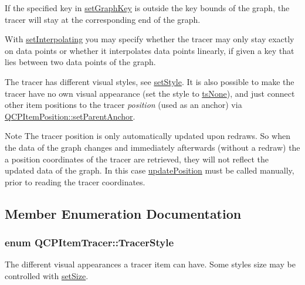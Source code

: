 If the specified key in \hyperlink{classQCPItemTracer_a6840143b42f3b685cedf7c6d83a704c8}{set\+Graph\+Key} is outside the key bounds of the graph, the tracer will stay at the corresponding end of the graph.

With \hyperlink{classQCPItemTracer_a6c244a9d1175bef12b50afafd4f5fcd2}{set\+Interpolating} you may specify whether the tracer may only stay exactly on data points or whether it interpolates data points linearly, if given a key that lies between two data points of the graph.

The tracer has different visual styles, see \hyperlink{classQCPItemTracer_a41a2ac4f1acd7897b4e2a2579c03204e}{set\+Style}. It is also possible to make the tracer have no own visual appearance (set the style to \hyperlink{classQCPItemTracer_a2f05ddb13978036f902ca3ab47076500aac27462c79146225bfa8fba24d2ee8a4}{ts\+None}), and just connect other item positions to the tracer {\itshape position} (used as an anchor) via \hyperlink{classQCPItemPosition_ac094d67a95d2dceafa0d50b9db3a7e51}{Q\+C\+P\+Item\+Position\+::set\+Parent\+Anchor}.

\begin{DoxyNote}{Note}
The tracer position is only automatically updated upon redraws. So when the data of the graph changes and immediately afterwards (without a redraw) the a position coordinates of the tracer are retrieved, they will not reflect the updated data of the graph. In this case \hyperlink{classQCPItemTracer_a5b90296109e36384aedbc8908a670413}{update\+Position} must be called manually, prior to reading the tracer coordinates. 
\end{DoxyNote}


\subsection{Member Enumeration Documentation}
\subsubsection[{\texorpdfstring{Tracer\+Style}{TracerStyle}}]{\setlength{\rightskip}{0pt plus 5cm}enum {\bf Q\+C\+P\+Item\+Tracer\+::\+Tracer\+Style}}\hypertarget{classQCPItemTracer_a2f05ddb13978036f902ca3ab47076500}{}\label{classQCPItemTracer_a2f05ddb13978036f902ca3ab47076500}
The different visual appearances a tracer item can have. Some styles size may be controlled with \hyperlink{classQCPItemTracer_ae47fe0617f5fef5fdb766999569be10a}{set\+Size}.

